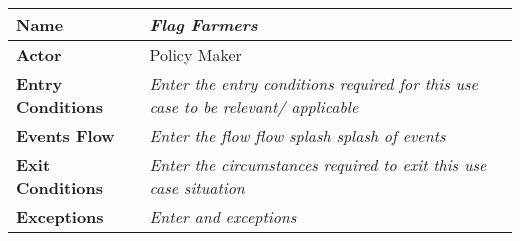 
\begin{center}
\begin{tabular}{|l|>{\raggedright\arraybackslash}m{12cm}|}

    \hline
    \textbf{Name} & \textit{Flag Farmers}\\
    \hline
   	\textbf{Actor} & Policy Maker\\
    \hline
    \textbf{Entry Conditions} & \textit{Enter the entry conditions required for this use case to be relevant/ applicable}\\
    \hline
    \textbf{Events Flow} & \textit{Enter the flow flow splash splash of events}\\
    \hline
    \textbf{Exit Conditions} & \textit{Enter the circumstances required to exit this use case situation}\\
    \hline
    \textbf{Exceptions} & \textit{Enter and exceptions}\\
    \hline
\end{tabular}
\end{center}
